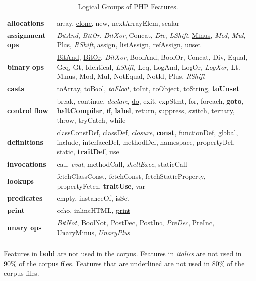 \documentclass[main.tex]{subfiles}
\begin{document}
\begin{table}
\begin{tabularx}{\columnwidth}{lX}
\textbf{allocations} & array, \underline{clone}, new, nextArrayElem, scalar \\
\textbf{assignment ops} & \textit{BitAnd}, \textit{BitOr}, \textit{BitXor}, Concat, \textit{Div}, \textit{LShift}, \underline{Minus}, \textit{Mod}, \textit{Mul}, Plus, \textit{RShift}, assign, listAssign, refAssign, unset \\
\textbf{binary ops} & \underline{BitAnd}, \underline{BitOr}, \textit{BitXor}, BoolAnd, BoolOr, Concat, Div, Equal, Geq, Gt, Identical, \textit{LShift}, Leq, LogAnd, LogOr, \textit{LogXor}, Lt, Minus, Mod, Mul, NotEqual, NotId, Plus, \textit{RShift} \\
\textbf{casts} & toArray, toBool, \textit{toFloat}, toInt, \underline{toObject}, toString, \textbf{toUnset} \\
\textbf{control flow} & break, continue, \textit{declare}, \underline{do}, exit, expStmt, for, foreach, \textbf{goto}, \textbf{haltCompiler}, if, \textbf{label}, return, suppress, switch, ternary, throw, tryCatch, while \\
\textbf{definitions} & classConstDef, classDef, \textit{closure}, \textbf{const}, functionDef, global, include, interfaceDef, methodDef, namespace, propertyDef, static, \textbf{traitDef}, use \\
\textbf{invocations} & call, \textit{eval}, methodCall, \textit{shellExec}, staticCall \\
\textbf{lookups} & fetchClassConst, fetchConst, fetchStaticProperty, propertyFetch, \textbf{traitUse}, var \\
\textbf{predicates} & empty, instanceOf, isSet \\
\textbf{print} & echo, inlineHTML, \underline{print} \\
\textbf{unary ops} & \textit{BitNot}, BoolNot, \underline{PostDec}, PostInc, \textit{PreDec}, PreInc, UnaryMinus, \textit{UnaryPlus} \\
 & \\ \end{tabularx}
\parbox{\columnwidth}{Features in \textbf{bold} are not used in the corpus. Features in \textit{italics} are not used in 90\% of the corpus files. Features that are \underline{underlined} are not used in 80\% of the corpus files.}
\ \vspace{1ex}
\caption{Logical Groups of PHP Features.\label{Table:FeatureGroups}}
\end{table}
\end{document}
